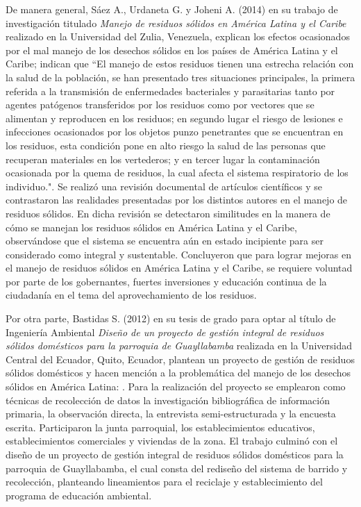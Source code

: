 De manera general, Sáez A., Urdaneta G. y Joheni A. (2014) en su trabajo de investigación titulado \textit{Manejo de residuos sólidos en América Latina y el Caribe} realizado en la Universidad del Zulia, Venezuela, explican los efectos ocasionados por el mal manejo de los desechos sólidos en los países de América Latina y el Caribe; indican que ``El manejo de estos residuos tienen una estrecha relación con la salud de la población, se han presentado tres situaciones principales, la primera referida a la transmisión de enfermedades bacteriales y parasitarias tanto por agentes patógenos transferidos por los residuos como por vectores que se alimentan y reproducen en los residuos; en segundo lugar el riesgo de lesiones e infecciones ocasionados por los objetos punzo penetrantes que se encuentran en los residuos, esta condición pone en alto riesgo la salud de las personas que recuperan materiales en los vertederos; y en tercer lugar la contaminación ocasionada por la quema de residuos, la cual afecta el sistema respiratorio de los individuo.". Se realizó una revisión documental de artículos científicos y se contrastaron las realidades presentadas por los distintos autores en el manejo de residuos sólidos. En dicha revisión se detectaron similitudes en la manera de cómo se manejan los residuos sólidos en América Latina y el Caribe, observándose que el sistema se encuentra aún en estado incipiente para ser considerado como integral y sustentable. Concluyeron que para lograr mejoras en el manejo de residuos sólidos en América Latina y el Caribe, se requiere voluntad por parte de los gobernantes, fuertes inversiones y educación continua de la ciudadanía en el tema del aprovechamiento de los residuos.

Por otra parte, Bastidas S. (2012) en su tesis de grado para optar al título de Ingeniería Ambiental \textit{Diseño de un proyecto de gestión integral de residuos sólidos domésticos para la parroquia de Guayllabamba} realizada en la Universidad Central del Ecuador, Quito, Ecuador, plantean un proyecto de gestión de residuos sólidos domésticos y hacen mención a la problemática del manejo de los desechos sólidos en América Latina: . Para la realización del proyecto se emplearon como técnicas de recolección de datos la investigación bibliográfica de información primaria, la observación directa, la entrevista semi-estructurada y la encuesta escrita. Participaron la junta parroquial, los establecimientos educativos, establecimientos comerciales y viviendas de la zona. El trabajo culminó con el diseño de un proyecto de gestión integral de residuos sólidos domésticos para la parroquia de Guayllabamba, el cual consta del rediseño del sistema de barrido y recolección, planteando lineamientos para el reciclaje y establecimiento del programa de educación ambiental.  

